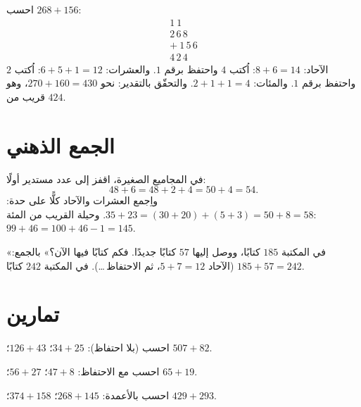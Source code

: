 \begin{example}\label{ex:g2:addition:worked}
احسب $268 + 156$:
\[
\begin{array}{r}
{\scriptstyle 1}\ {\scriptstyle 1}\ \phantom{0} \\[-3pt]
2\,6\,8 \\
+\ 1\,5\,6 \\
\hline
4\,2\,4
\end{array}
\]
الآحاد: $8 + 6 = 14$: اُكتب $4$ واحتفظ برقم $1$. والعشرات:
$6 + 5 + 1 = 12$: اُكتب $2$ واحتفظ برقم $1$. والمئات:
$2 + 1 + 1 = 4$. والتحقّق بالتقدير: نحو $270 + 160 = 430$، وهو قريب
من $424$. \checkmark
\end{example}

\section{الجمع الذهني}

\begin{example}\label{ex:g2:addition:mental}
في المجاميع الصغيرة، اقفز إلى عدد مستدير أولًا:
\[
48 + 6 = 48 + 2 + 4 = 50 + 4 = 54 .
\]
واِجمع العشرات والآحاد كلًّا على حدة:
$35 + 23 = (30 + 20) + (5 + 3) = 50 + 8 = 58$. وحيلة القريب من
المئة: $99 + 46 = 100 + 46 - 1 = 145$.
\end{example}

\begin{example}\label{ex:g2:addition:problem}
«في المكتبة $185$ كتابًا، ووصل إليها $57$ كتابًا جديدًا. فكم
كتابًا فيها الآن؟» بالجمع: $185 + 57 = 242$ (الآحاد $5 + 7 = 12$،
ثم الاحتفاظ\,\dots). في المكتبة $242$ كتابًا.
\end{example}

\section{تمارين}

\begin{exercise}[$\star$]\label{exo:g2:addition:1}
احسب (بلا احتفاظ): $34 + 25$؛ \quad $126 + 43$؛ \quad
$507 + 82$.
\end{exercise}

\begin{exercise}[$\star$]\label{exo:g2:addition:2}
احسب مع الاحتفاظ: $47 + 8$؛ \quad $56 + 27$؛ \quad $65 + 19$.
\end{exercise}

\begin{exercise}[$\star$]\label{exo:g2:addition:3}
احسب بالأعمدة: $268 + 145$؛ \quad $374 + 158$؛ \quad
$429 + 293$.
\end{exercise}

